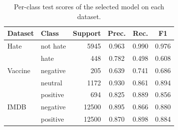 \begin{table}[t]
\centering
\caption{Per-class test scores of the selected model on each dataset.}
\label{tab:perclass}
\begin{tabular}{llrccc}
\toprule
Dataset & Class & Support & Prec. & Rec. & F1 \\
\midrule
Hate & not hate & 5945 & 0.963 & 0.990 & 0.976 \\
 & hate & 448 & 0.782 & 0.498 & 0.608 \\
Vaccine & negative & 205 & 0.639 & 0.741 & 0.686 \\
 & neutral & 1172 & 0.930 & 0.861 & 0.894 \\
 & positive & 694 & 0.825 & 0.889 & 0.856 \\
IMDB & negative & 12500 & 0.895 & 0.866 & 0.880 \\
 & positive & 12500 & 0.870 & 0.898 & 0.884 \\
\bottomrule
\end{tabular}
\end{table}